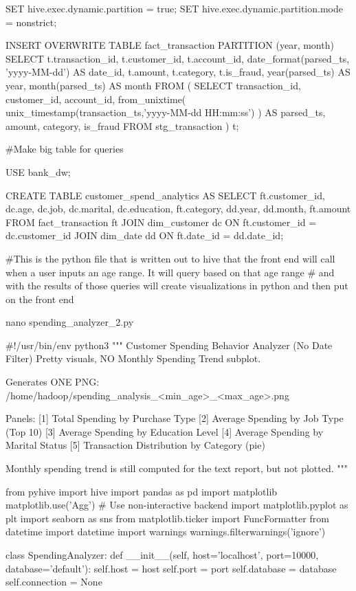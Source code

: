 SET hive.exec.dynamic.partition = true;
SET hive.exec.dynamic.partition.mode = nonstrict;

INSERT OVERWRITE TABLE fact_transaction
PARTITION (year, month)
SELECT
  t.transaction_id,
  t.customer_id,
  t.account_id,
  date_format(parsed_ts, 'yyyy-MM-dd') AS date_id,
  t.amount,
  t.category,
  t.is_fraud,
  year(parsed_ts)                      AS year,
  month(parsed_ts)                     AS month
FROM (
  SELECT
    transaction_id,
    customer_id,
    account_id,
    from_unixtime(
      unix_timestamp(transaction_ts,'yyyy-MM-dd HH:mm:ss')
    ) AS parsed_ts,
    amount,
    category,
    is_fraud
  FROM stg_transaction
) t;

#Make big table for queries

USE bank_dw;

CREATE TABLE customer_spend_analytics AS
SELECT
    ft.customer_id,
    dc.age,
    dc.job,
    dc.marital,
    dc.education,
    ft.category,
    dd.year,
    dd.month,
    ft.amount
FROM fact_transaction ft
JOIN dim_customer dc 
    ON ft.customer_id = dc.customer_id
JOIN dim_date dd
    ON ft.date_id = dd.date_id;


#This is the python file that is written out to hive that the front end will call when a user inputs an age range. It will query based on that age range
# and with the results of those queries will create visualizations in python and then put on the front end


nano spending_analyzer_2.py

#!/usr/bin/env python3
"""
Customer Spending Behavior Analyzer (No Date Filter)
Pretty visuals, NO Monthly Spending Trend subplot.

Generates ONE PNG:
    /home/hadoop/spending_analysis_<min_age>_<max_age>.png

Panels:
  [1] Total Spending by Purchase Type
  [2] Average Spending by Job Type (Top 10)
  [3] Average Spending by Education Level
  [4] Average Spending by Marital Status
  [5] Transaction Distribution by Category (pie)

Monthly spending trend is still computed for the text report, but not plotted.
"""

from pyhive import hive
import pandas as pd
import matplotlib
matplotlib.use('Agg')  # Use non-interactive backend
import matplotlib.pyplot as plt
import seaborn as sns
from matplotlib.ticker import FuncFormatter
from datetime import datetime
import warnings
warnings.filterwarnings('ignore')


class SpendingAnalyzer:
    def __init__(self, host='localhost', port=10000, database='default'):
        self.host = host
        self.port = port
        self.database = database
        self.connection = None

